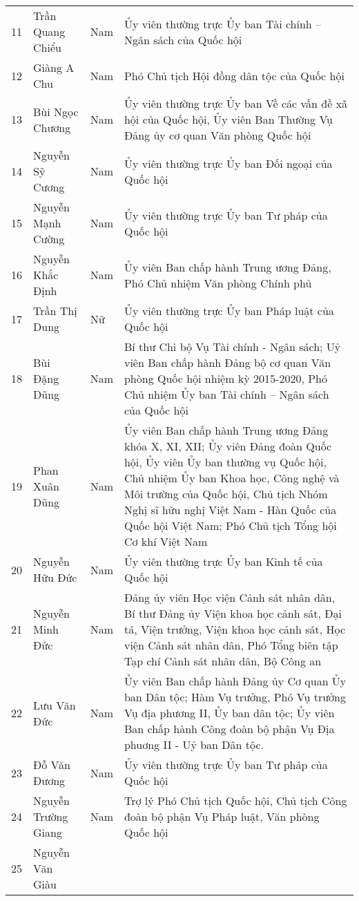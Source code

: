 \begin{longtable}{p{}p{}p{}p{}}
11 &
  Trần Quang Chiểu &
  Nam &
  Ủy viên thường trực Ủy ban Tài chính – Ngân sách của Quốc hội \\
12 &
  Giàng A Chu &
  Nam &
  Phó Chủ tịch Hội đồng dân tộc của Quốc hội \\
13 &
  Bùi Ngọc Chương &
  Nam &
  Ủy viên thường trực Ủy ban Về các vấn đề xã hội của Quốc hội, Ủy viên Ban Thường Vụ Đảng ủy cơ quan Văn phòng Quốc hội \\
14 &
  Nguyễn Sỹ Cương &
  Nam &
  Ủy viên thường trực Ủy ban Đối ngoại của Quốc hội \\
15 &
  Nguyễn Mạnh Cường &
  Nam &
  Ủy viên thường trực Ủy ban Tư pháp của Quốc hội \\
16 &
  Nguyễn Khắc Định &
  Nam &
  Ủy viên Ban chấp hành Trung ương Đảng, Phó Chủ nhiệm Văn phòng Chính phủ \\
17 &
  Trần Thị Dung &
  Nữ &
  Ủy viên thường trực Ủy ban Pháp luật của Quốc hội \\
18 &
  Bùi Đặng Dũng &
  Nam &
  Bí thư Chi bộ Vụ Tài chính - Ngân sách; Uỷ viên Ban chấp hành Đảng bộ cơ quan Văn phòng Quốc hội nhiệm kỳ 2015-2020, Phó Chủ nhiệm Ủy ban Tài chính – Ngân sách của Quốc hội \\
19 &
  Phan Xuân Dũng &
  Nam &
  Ủy viên Ban chấp hành Trung ương Đảng khóa X, XI, XII; Ủy viên Đảng đoàn Quốc hội, Ủy viên Ủy ban thường vụ Quốc hội, Chủ nhiệm Ủy ban Khoa học, Công nghệ và Môi trường của Quốc hội, Chủ tịch Nhóm Nghị sĩ hữu nghị Việt Nam - Hàn Quốc của Quốc hội Việt Nam; Phó Chủ tịch Tổng hội Cơ khí Việt Nam \\
20 &
  Nguyễn Hữu Đức &
  Nam &
  Ủy viên thường trực Ủy ban Kinh tế của Quốc hội \\
21 &
  Nguyễn Minh Đức &
  Nam &
  Đảng ủy viên Học viện Cảnh sát nhân dân, Bí thư Đảng ủy Viện khoa học cảnh sát, Đại tá, Viện trưởng, Viện khoa học cảnh sát, Học viện Cảnh sát nhân dân, Phó Tổng biên tập Tạp chí Cảnh sát nhân dân, Bộ Công an \\
22 &
  Lưu Văn Đức &
  Nam &
  Ủy viên Ban chấp hành Đảng ủy Cơ quan Ủy ban Dân tộc; Hàm Vụ trưởng, Phó Vụ trưởng Vụ địa phương II, Ủy ban dân tộc; Ủy viên Ban chấp hành Công đoàn bộ phận Vụ Địa phuơng II - Uỷ ban Dân tộc. \\
23 &
  Đỗ Văn Đương &
  Nam &
  Ủy viên thường trực Ủy ban Tư pháp của Quốc hội \\
24 &
  Nguyễn Trường Giang &
  Nam &
  Trợ lý Phó Chủ tịch Quốc hội, Chủ tịch Công đoàn bộ phận Vụ Pháp luật, Văn phòng Quốc hội \\
25 &
  Nguyễn Văn Giàu &

\end{longtable}
